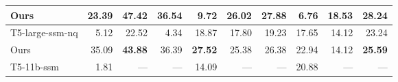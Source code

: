 \begin{table*}[ht]
{\begin{tabular}{lrrrrrrrrr}
    Ours    & 23.39                                                                  & \textbf{47.42}                                                   & 36.54                                                               & 9.72                                                                   & 26.02                                                            & \textbf{27.88}                                                      & 6.76                                                                   & 18.53                                                            & \textbf{28.24}                                                      \\ \hline
    T5-large-ssm-nq        & 5.12                                                                   & 22.52                                                            & 4.34                                                                & 18.87                                                                  & 17.80                                                            & 19.23                                                               & 17.65                                                                  & 14.12                                                            & 23.24                                                               \\ 
    Ours & 35.09                                                                  & \textbf{43.88}                                                   & 36.39                                                               & \textbf{27.52}                                                         & 25.38                                                            & 26.38                                                               & 22.94                                                                  & 14.12                                                            & \textbf{25.59}                                                      \\ \hline
    T5-11b-ssm             & 1.81                                                                   & ---                                                              & ---                                                                 & 14.09                                                                  & ---                                                              & ---                                                                 & 20.88                                                                  & ---                                                              & ---                                                                 \\ 

\end{tabular}}
\end{table*}
